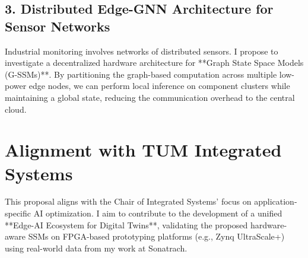 \documentclass[11pt,a4paper]{article}
\begin{document}
\subsection{3. Distributed Edge-GNN Architecture for Sensor Networks}
Industrial monitoring involves networks of distributed sensors. I propose to investigate a decentralized hardware architecture for **Graph State Space Models (G-SSMs)**. By partitioning the graph-based computation across multiple low-power edge nodes, we can perform local inference on component clusters while maintaining a global state, reducing the communication overhead to the central cloud.

\section{Alignment with TUM Integrated Systems}
This proposal aligns with the Chair of Integrated Systems' focus on application-specific AI optimization. I aim to contribute to the development of a unified **Edge-AI Ecosystem for Digital Twins**, validating the proposed hardware-aware SSMs on FPGA-based prototyping platforms (e.g., Zynq UltraScale+) using real-world data from my work at Sonatrach.
\end{document}
